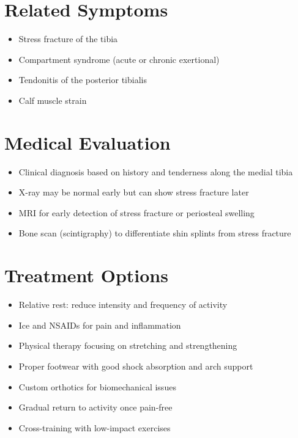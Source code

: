 \section*{Related Symptoms}
\begin{itemize}
\item Stress fracture of the tibia
\item Compartment syndrome (acute or chronic exertional)
\item Tendonitis of the posterior tibialis
\item Calf muscle strain
\end{itemize}

\section*{Medical Evaluation}
\begin{itemize}
\item Clinical diagnosis based on history and tenderness along the medial tibia
\item X-ray may be normal early but can show stress fracture later
\item MRI for early detection of stress fracture or periosteal swelling
\item Bone scan (scintigraphy) to differentiate shin splints from stress fracture
\end{itemize}

\section*{Treatment Options}
\begin{itemize}
\item Relative rest: reduce intensity and frequency of activity
\item Ice and NSAIDs for pain and inflammation
\item Physical therapy focusing on stretching and strengthening
\item Proper footwear with good shock absorption and arch support
\item Custom orthotics for biomechanical issues
\item Gradual return to activity once pain-free
\item Cross-training with low-impact exercises
\end{itemize}

